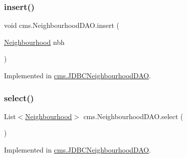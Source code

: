 \subsubsection{\texorpdfstring{insert()}{insert()}}
{\footnotesize\ttfamily void cms.\+Neighbourhood\+D\+A\+O.\+insert (\begin{DoxyParamCaption}\item[{\mbox{\hyperlink{classcms_1_1_neighbourhood}{Neighbourhood}}}]{nbh }\end{DoxyParamCaption})}



Implemented in \mbox{\hyperlink{classcms_1_1_j_d_b_c_neighbourhood_d_a_o_a5d43b764d1f27721d860dc371ae4b08e}{cms.\+J\+D\+B\+C\+Neighbourhood\+D\+AO}}.

\mbox{\label{interfacecms_1_1_neighbourhood_d_a_o_af9fd7094c23742d68b86f0a83f544f9d}} 
\subsubsection{\texorpdfstring{select()}{select()}}
{\footnotesize\ttfamily List$<$\mbox{\hyperlink{classcms_1_1_neighbourhood}{Neighbourhood}}$>$ cms.\+Neighbourhood\+D\+A\+O.\+select (\begin{DoxyParamCaption}{ }\end{DoxyParamCaption})}



Implemented in \mbox{\hyperlink{classcms_1_1_j_d_b_c_neighbourhood_d_a_o_a31a2e927837aa79108ef13890dd9be75}{cms.\+J\+D\+B\+C\+Neighbourhood\+D\+AO}}.

